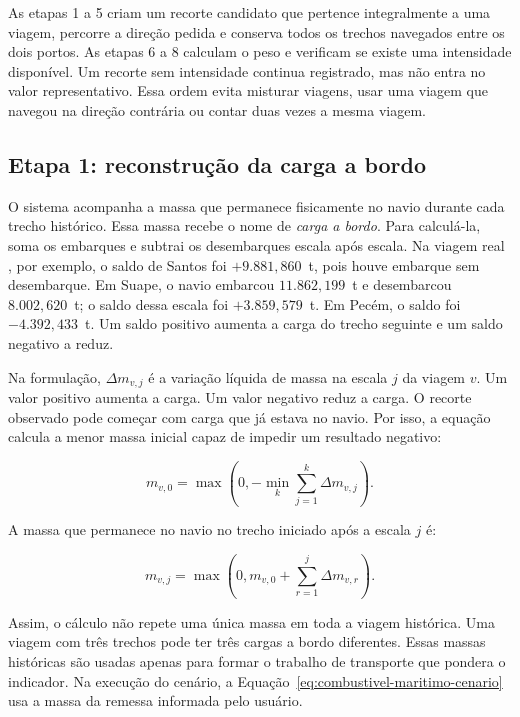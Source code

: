 As etapas 1 a 5 criam um recorte candidato que pertence integralmente a uma viagem, percorre a direção pedida e conserva todos os trechos navegados entre os dois portos. As etapas 6 a 8 calculam o peso e verificam se existe uma intensidade disponível. Um recorte sem intensidade continua registrado, mas não entra no valor representativo. Essa ordem evita misturar viagens, usar uma viagem que navegou na direção contrária ou contar duas vezes a mesma viagem.

\subsection*{Etapa 1: reconstrução da carga a bordo}

O sistema acompanha a massa que permanece fisicamente no navio durante cada trecho histórico. Essa massa recebe o nome de \emph{carga a bordo}. Para calculá-la, soma os embarques e subtrai os desembarques escala após escala. Na viagem real , por exemplo, o saldo de Santos foi \(+9.881{,}860\)~t, pois houve embarque sem desembarque. Em Suape, o navio embarcou \(11.862{,}199\)~t e desembarcou \(8.002{,}620\)~t; o saldo dessa escala foi \(+3.859{,}579\)~t. Em Pecém, o saldo foi \(-4.392{,}433\)~t. Um saldo positivo aumenta a carga do trecho seguinte e um saldo negativo a reduz.

Na formulação, \(\Delta m_{v,j}\) é a variação líquida de massa na escala \(j\) da viagem \(v\). Um valor positivo aumenta a carga. Um valor negativo reduz a carga. O recorte observado pode começar com carga que já estava no navio. Por isso, a equação calcula a menor massa inicial capaz de impedir um resultado negativo:

\begin{equation}
m_{v,0}=\max\left(0,-\min_k\sum_{j=1}^{k}\Delta m_{v,j}\right).
\label{eq:carga-inicial-maritima}
\end{equation}

A massa que permanece no navio no trecho iniciado após a escala \(j\) é:

\begin{equation}
m_{v,j}=\max\left(0,m_{v,0}+\sum_{r=1}^{j}\Delta m_{v,r}\right).
\label{eq:carga-bordo-subtrecho}
\end{equation}

Assim, o cálculo não repete uma única massa em toda a viagem histórica. Uma viagem com três trechos pode ter três cargas a bordo diferentes. Essas massas históricas são usadas apenas para formar o trabalho de transporte que pondera o indicador. Na execução do cenário, a Equação~\ref{eq:combustivel-maritimo-cenario} usa a massa da remessa informada pelo usuário.


